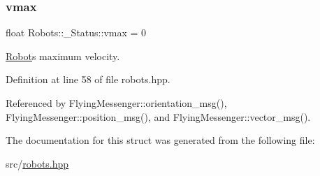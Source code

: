 \subsubsection{\texorpdfstring{vmax}{vmax}}
{\footnotesize\ttfamily float Robots\+::\+\_\+\+Status\+::vmax = 0}



\hyperlink{struct_robots_1_1_robot}{Robot}\textquotesingle{}s maximum velocity. 



Definition at line 58 of file robots.\+hpp.



Referenced by Flying\+Messenger\+::orientation\+\_\+msg(), Flying\+Messenger\+::position\+\_\+msg(), and Flying\+Messenger\+::vector\+\_\+msg().



The documentation for this struct was generated from the following file\+:\begin{DoxyCompactItemize}
\item 
src/\hyperlink{robots_8hpp}{robots.\+hpp}\end{DoxyCompactItemize}
